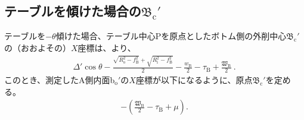 \subsection[テーブルを傾けた場合の\texorpdfstring{$\mathfrak B_\mathrm c'$}{Bc'}]
           {テーブルを傾けた場合の$\boldsymbol{\mathfrak B_\mathrm c'}$}
テーブルを$-\theta$傾けた場合、テーブル中心Pを原点としたボトム側の外削中心$\mathfrak B_\mathrm c'$の（おおよその）$X$座標は、より、
\begin{align}
  \label{eq:gaisakucenterBt}
  \Delta'\cos\theta-\frac{\sqrt{R_\mathrm o^2-f_\mathrm B^2}+\sqrt{R_\mathrm i^2-f_\mathrm B^2}}2
  -\frac{w_\mathrm B}2-\tau_\mathrm B+\frac{\mathfrak W_\mathrm B}2\ .
\end{align}
このとき、測定したA側内面b$_\mathrm o'$の$X$座標が以下になるように、原点$\mathfrak B_\mathrm c'$を定める。
\begin{align}
  \label{eq:gaisakucenterBr}
  -\left(\frac{\mathfrak W_\mathrm B}2-\tau_\mathrm B+\mu\right).
\end{align}


